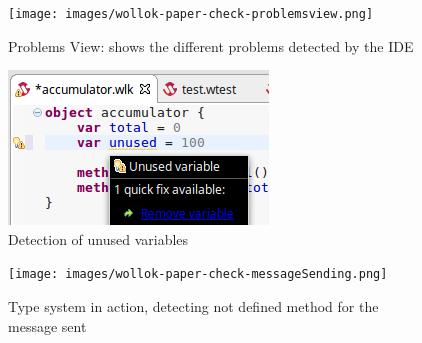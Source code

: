 \begin{figure}[ht]
    \centering
	\texttt{[image: images/wollok-paper-check-problemsview.png]}
    \caption{Problems View: shows the different problems detected by the IDE }
    \label{fig:problemsview.png}
\end{figure}

\begin{figure}[ht]
    \centering
	\includegraphics[scale=0.5]{images/wollok-paper-check-unusedVariable.png}
    \caption{Detection of unused variables}
    \label{fig:check-unusedVariable.png}
\end{figure}

\begin{figure}[ht]
    \centering
	\texttt{[image: images/wollok-paper-check-messageSending.png]}
    \caption{Type system in action, detecting not defined method for the message sent}
    \label{fig:check-messageSending.png}
\end{figure}
